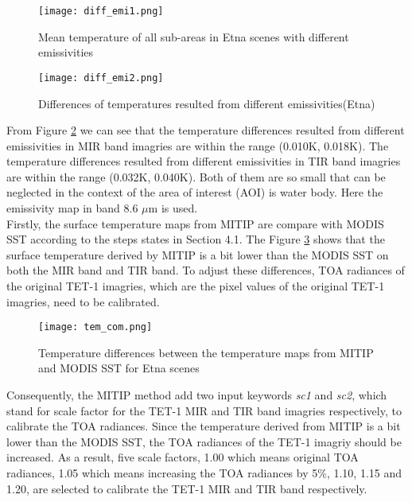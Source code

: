 \begin{figure}[!htbp]
\centering\texttt{[image: diff\_emi1.png]}
\caption{Mean temperature of all sub-areas in Etna scenes with different emissivities}
\label{fig:tem_diff_emi1}
\end{figure}

\begin{figure}[!htbp]
\centering\texttt{[image: diff\_emi2.png]}
\caption{Differences of temperatures resulted from different emissivities(Etna)}
\label{fig:tem_diff_emi2}
\end{figure}

\noindent From Figure \ref{fig:tem_diff_emi2} we can see that the temperature differences resulted from different emissivities in MIR band imagries are within the range (0.010K, 0.018K). The temperature differences resulted from different emissivities in TIR band imagries are within the range (0.032K, 0.040K). Both of them are so small that can be neglected in the context of the area of interest (AOI) is water body. Here the emissivity map in band 8.6 $\mu$m is used.\\

\noindent Firstly, the surface temperature maps from MITIP are compare with MODIS SST according to the steps states in Section 4.1. The Figure \ref{fig:tem_com} shows that the surface temperature derived by MITIP is a bit lower than the MODIS SST on both the MIR band and TIR band. To adjust these differences, TOA radiances of the original TET-1 imagries, which are the pixel values of the original TET-1 imagries, need to be calibrated.\\

\begin{figure}[!htbp]
\centering\texttt{[image: tem\_com.png]}
\caption{Temperature differences between the temperature maps from MITIP and MODIS SST for Etna scenes}
\label{fig:tem_com}
\end{figure}

\noindent Consequently, the MITIP method add two input keywords \emph{sc1} and \emph{sc2}, which stand for scale factor for the TET-1 MIR and TIR band imagries respectively, to calibrate the TOA radiances. Since the temperature derived from MITIP is a bit lower than the MODIS SST, the TOA radiances of the TET-1 imagriy should be increased. As a result, five scale factors, 1.00 which means original TOA radiances, 1.05 which means increasing the TOA radiances by 5\%, 1.10, 1.15 and 1.20, are selected to calibrate the TET-1 MIR and TIR band respectively.\\

